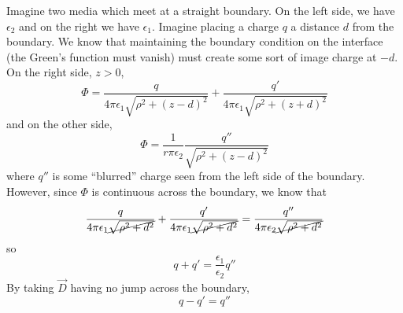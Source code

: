 \documentclass[a4paper,twoside,master.tex]{subfiles}
\begin{document}
\begin{ex}
    Imagine two media which meet at a straight boundary. On the left side, we have $ \epsilon_2 $ and on the right we have $ \epsilon_1 $. Imagine placing a charge $ q $ a distance $ d $ from the boundary. We know that maintaining the boundary condition on the interface (the Green's function must vanish)  must create some sort of image charge at $ -d $. On the right side, $ z > 0 $,
    \begin{equation}
        \Phi = \frac{q}{4 \pi \epsilon_1 \sqrt{\rho^2 + (z-d)^2}} + \frac{q'}{4 \pi \epsilon_1 \sqrt{\rho^2 + (z+d)^2}}
    \end{equation}
    and on the other side,
    \begin{equation}
        \Phi = \frac{1}{r \pi \epsilon_2} \frac{q''}{\sqrt{\rho^2 + (z-d)^2}}
    \end{equation}
    where $ q'' $ is some ``blurred'' charge seen from the left side of the boundary. However, since $ \Phi $ is continuous across the boundary, we know that
    \begin{equation}
        \frac{q}{4 \pi \epsilon_1 \cancel{\sqrt{\rho^2 + d^2}}} + \frac{q'}{4 \pi \epsilon_1 \cancel{\sqrt{\rho^2 + d^2}}} = \frac{q''}{4 \pi \epsilon_2 \cancel{\sqrt{\rho^2 + d^2}}}
    \end{equation}
    so
    \begin{equation}
        q + q' = \frac{\epsilon_1}{\epsilon_2} q''
    \end{equation}
    By taking $ \vec{D} $ having no jump across the boundary,
    \begin{equation}
        q - q' = q''
    \end{equation}
\end{ex}
\end{document}
